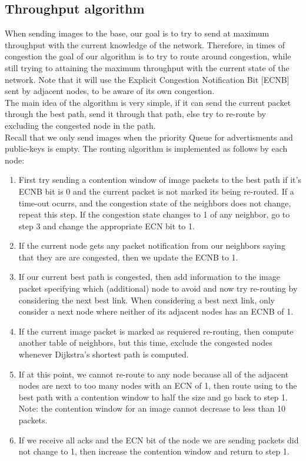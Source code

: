 \documentclass[letterpaper]{article}
\begin{document}
\subsection{Throughput algorithm}

When sending images to the base, our goal is to try to send at maximum throughput with the current knowledge of the network. Therefore, in times of congestion the goal of our algorithm is to try to route around congestion, while still trying to attaining the maximum throughput with the current state of the network. Note that it will use the Explicit Congestion Notification Bit [ECNB] sent by adjacent nodes, to be aware of its own congestion.\\ 

The main idea of the algorithm is very simple, if it can send the current packet through the best path, send it through that path, else try to re-route by excluding the congested node in the path.\\

Recall that we only send images when the priority Queue for advertisments and public-keys is empty. The routing algorithm is implemented as follows by each node:

\begin{enumerate}
  \item First try sending a contention window of image packets to the best path if it's ECNB bit is 0 and the current packet is not marked its being re-routed. If a time-out ocurrs, and the congestion state of the neighbors does not change, repeat this step. If the congestion state changes to 1 of any neighbor, go to step 3 and change the appropriate ECN bit to 1.
  \item If the current node gets any packet notification from our neighbors saying that they are are congested, then we update the ECNB to 1.
  \item If our current best path is congested, then add information to the image packet specifying which (additional) node to avoid and now try re-routing by considering the next best link. When considering a best next link, only consider a next node where neither of its adjacent nodes has an ECNB of 1. 
  \item If the current image packet is marked as requiered re-routing, then compute another table of neighbors, but this time, exclude the congested nodes whenever Dijkstra's shortest path is computed.
  \item If at this point, we cannot re-route to any node because all of the adjacent nodes are next to too many nodes with an ECN of 1, then route using to the best path with a contention window to half the size and go back to step 1. Note: the contention window for an image cannot decrease to less than 10 packets.
  \item If we receive all acks and the ECN bit of the node we are sending packets did not change to 1, then increase the contention window and return to step 1.
\end{enumerate}
\end{document}
